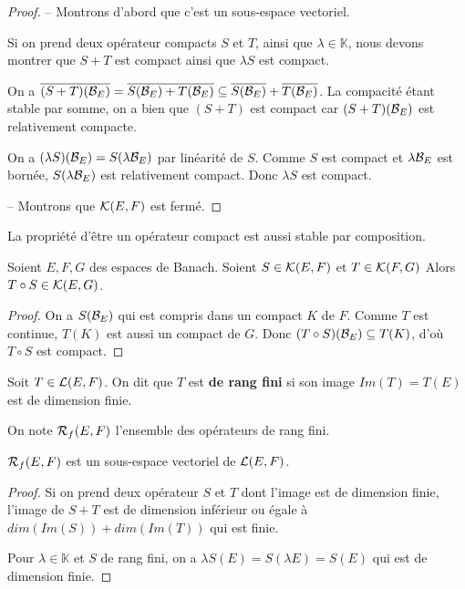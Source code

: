 \begin{proof}
	-- Montrons d'abord que c'est un sous-espace vectoriel.

	Si on prend deux opérateur compacts $S$ et $T$, ainsi que $\lambda \in
	\mathbb{K}$, nous devons montrer que $S + T$ est compact ainsi que $\lambda S$
	est compact.

	On a $\overline{(S + T)(\mathcal{B}_{E})} =  \overline{S(\mathcal{B}_{E}) +
	T(\mathcal{B}_{E})} \subseteq \overline{S(\mathcal{B}_{E})} +
	\overline{T(\mathcal{B}_{E})}$. La compacité étant stable par somme, on a bien
	que $(S + T)$ est compact car $(S + T)(\mathcal{B}_{E})$ est relativement
	compacte.

	On a $(\lambda S)(\mathcal{B}_{E}) = S(\lambda \mathcal{B}_{E})$ par
	linéarité de $S$. Comme $S$ est compact et $\lambda \mathcal{B}_{E}$ est
	bornée, $S(\lambda \mathcal{B}_{E})$ est relativement compact. Donc
	$\lambda S$ est compact.

	-- Montrons que $\mathcal{K}(E, F)$ est fermé.
\end{proof}

La propriété d'être un opérateur compact est aussi stable par composition.

\begin{proposition}
	Soient $E, F, G$ des espaces de Banach.
	Soient $S \in \mathcal{K}(E, F)$ et $T \in \mathcal{K}(F, G)$
	Alors $T \circ S \in \mathcal{K}(E, G)$.
\end{proposition}

\begin{proof}
	On a $S(\mathcal{B}_{E})$ qui est compris dans un compact $K$ de $F$. Comme $T$ est
	continue, $T(K)$ est aussi un compact de $G$. Donc $(T \circ
	S)(\mathcal{B}_{E}) \subseteq T(K)$, d'où $T \circ S$ est compact.
\end{proof}

\begin{definition}
	Soit $T \in \mathcal{L}(E, F)$. On dit que $T$ est \textbf{de rang fini}
	si son image $Im(T) = T(E)$ est de dimension finie.

	On note $\mathcal{R}_{f}(E, F)$ l'ensemble des opérateurs de rang fini.
\end{definition}

\begin{proposition}
	$\mathcal{R}_{f}(E, F)$ est un sous-espace vectoriel de
	$\mathcal{L}(E, F)$.
\end{proposition}

\begin{proof}
	Si on prend deux opérateur $S$ et $T$ dont l'image est de dimension finie,
	l'image de $S + T$ est de dimension inférieur ou égale à $dim(Im(S)) +
	dim(Im(T))$ qui est finie.

	Pour $\lambda \in \mathbb{K}$ et $S$ de rang fini, on a $\lambda S(E) =
	S(\lambda E) = S(E)$ qui est de dimension finie.
\end{proof}

